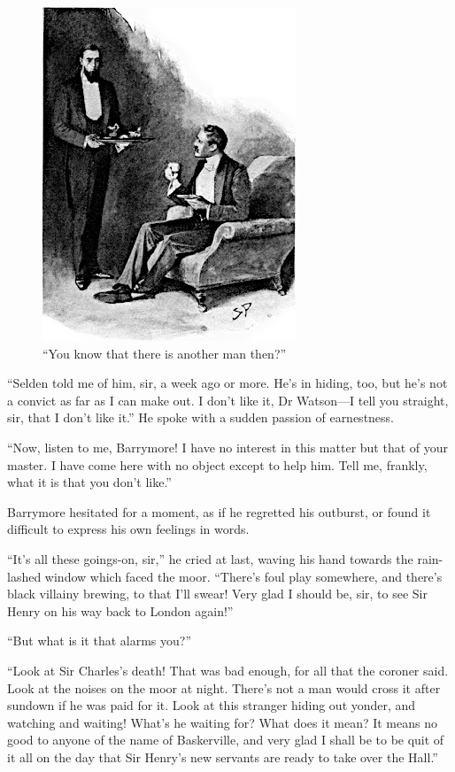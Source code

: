 \documentclass[paper=a5,BCOR=7mm,twoside,DIV=calc,12pt,usegeometry,openany,chapterprefix,endperiod,headings=big]{scrbook} %
\begin{document}
\begin{figure}[tbh]
\centering
\includegraphics[width=.7\linewidth]{09_anotherman}
\caption{\enquote{You know that there is another man then?}}
\end{figure}

\enquote{Selden told me of him, sir, a week ago or more. He's in hiding, too, but he's not a convict as far as I can make out. I don't like it, Dr Watson---I tell you straight, sir, that I don't like it.} He spoke with a sudden passion of earnestness.

\enquote{Now, listen to me, Barrymore! I have no interest in this matter but that of your master. I have come here with no object except to help him. Tell me, frankly, what it is that you don't like.}

Barrymore hesitated for a moment, as if he regretted his outburst, or found it difficult to express his own feelings in words.

\enquote{It's all these goings-on, sir,} he cried at last, waving his hand towards the rain-lashed window which faced the moor. \enquote{There's foul play somewhere, and there's black villainy brewing, to that I'll swear! Very glad I should be, sir, to see Sir Henry on his way back to London again!}

\enquote{But what is it that alarms you?}

\enquote{Look at Sir Charles's death! That was bad enough, for all that the coroner said. Look at the noises on the moor at night. There's not a man would cross it after sundown if he was paid for it. Look at this stranger hiding out yonder, and watching and waiting! What's he waiting for? What does it mean? It means no good to anyone of the name of Baskerville, and very glad I shall be to be quit of it all on the day that Sir Henry's new servants are ready to take over the Hall.}
\end{document}
